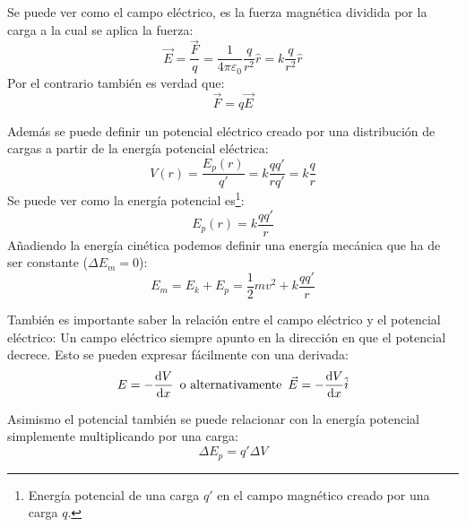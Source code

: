 \documentclass[arial,a4paper,print]{article}
\begin{document}
Se puede ver como el campo eléctrico, es la fuerza magnética dividida por la carga a la cual se aplica la fuerza:
\begin{equation*}
	\vec{E} = \frac{\vec{F}}{q} = \frac{1}{4\pi\varepsilon_{0}} \frac{q}{r^{2}}\hat{r} = k\frac{q}{r^2}\hat{r}
\end{equation*}
Por el contrario también es verdad que:
\begin{equation*}
	\vec{F} = q\vec{E}
\end{equation*}

Además se puede definir un potencial eléctrico creado por una distribución de cargas a partir de la energía potencial eléctrica:
\begin{equation*}
	V(r) = \frac{E_{p}(r)}{q'} = k\frac{qq'}{rq'} = k\frac{q}{r}
\end{equation*} 
Se puede ver como la energía potencial es\footnote{Energía potencial de una carga $q'$ en el campo magnético creado por una carga $q$.}:
\begin{equation*}
	E_{p}(r)=k\frac{qq'}{r}
\end{equation*}
Añadiendo la energía cinética podemos definir una energía mecánica que ha de ser constante ($\Delta E_{m} = 0$):
\begin{equation*}
	E_{m} = E_{k} + E_{p} = \frac12 mv^{2} + k\frac{qq'}{r}
\end{equation*}

También es importante saber la relación entre el campo eléctrico y el potencial eléctrico: Un campo eléctrico siempre apunto en la dirección en que el potencial decrece. Esto se pueden expresar fácilmente con una derivada:
\begin{equation*}
	E = -\dv{V}{x}\,\text{ o alternativamente }\, \vec{E} = -\dv{V}{x}\hat{i}
\end{equation*}

Asimismo el potencial también se puede relacionar con la energía potencial simplemente multiplicando por una carga:
\begin{equation*}
	\Delta E_{p} = q'\Delta V
\end{equation*}

\pagebreak
\end{document}
